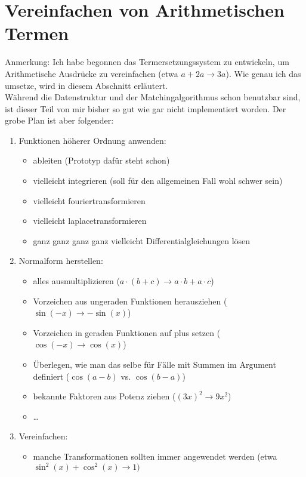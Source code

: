 \documentclass{article}
\begin{document}
\section{Vereinfachen von Arithmetischen Termen}
\begin{itshape}
Anmerkung: Ich habe begonnen das Termersetzungssystem zu entwickeln, um Arithmetische Ausdrücke zu vereinfachen (etwa $a + 2 a \rightarrow 3 a$). Wie genau ich das umsetze, wird in diesem Abschnitt erläutert.
\\Während die Datenstruktur und der Matchingalgorithmus schon benutzbar sind, ist dieser Teil von mir bisher so gut wie gar nicht implementiert worden. Der grobe Plan ist aber folgender:
\begin{enumerate}
    \item Funktionen höherer Ordnung anwenden:
    \begin{itemize}
        \item ableiten (Prototyp dafür steht schon)
        \item vielleicht integrieren (soll für den allgemeinen Fall wohl schwer sein)
        \item vielleicht fouriertransformieren
        \item vielleicht laplacetransformieren
        \item ganz ganz ganz ganz vielleicht Differentialgleichungen lösen
    \end{itemize}
    \item Normalform herstellen:
    \begin{itemize}
        \item alles ausmultiplizieren ($a\cdot (b + c) \rightarrow a\cdot b + a\cdot c$)
        \item Vorzeichen aus ungeraden Funktionen herausziehen ($\sin(-x) \rightarrow -\sin(x)$)
        \item Vorzeichen in geraden Funktionen auf plus setzen ($\cos(-x) \rightarrow \cos(x)$)
        \item Überlegen, wie man das selbe für Fälle mit Summen im Argument definiert ($\cos(a - b)$ vs. $\cos(b - a)$)
        \item bekannte Faktoren aus Potenz ziehen ($(3 x)^2 \rightarrow 9 x^2$)
        \item \dots
    \end{itemize}
    \item Vereinfachen:
    \begin{itemize}
        \item manche Transformationen sollten immer angewendet werden (etwa $\sin^2(x) + \cos^2(x) \rightarrow 1)$

\end{itemize}
\end{enumerate}
\end{itshape}
\end{document}
